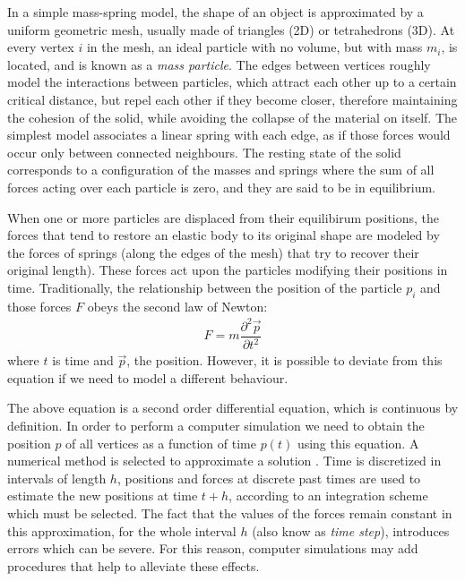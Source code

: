 \documentclass[journal]{IEEEtran}
\begin{document}
In a simple mass-spring model, the shape of an object is approximated by a uniform geometric mesh, usually made of triangles (2D) or tetrahedrons (3D).  At every vertex $i$ in the mesh, an ideal particle with no volume, but with mass $m_i$, is located, and is known as a \textit{mass particle}.  The edges between vertices roughly model the interactions between particles, which attract each other up to a certain critical distance, but repel each other if they become closer, therefore maintaining the cohesion of the solid, while avoiding the collapse of the material on itself.  The simplest model associates a linear spring with each edge, as if those forces would occur only between connected neighbours.  The resting state of the solid corresponds to a configuration of the masses and springs where the sum of all forces acting over each particle is zero, and they are said to be in equilibrium.

When one or more particles are displaced from their equilibirum positions, the forces that tend to restore an elastic body to its original shape are modeled by the forces of springs (along the edges of the mesh) that try to recover their original length).  These forces act upon the particles modifying their positions in time.  Traditionally, the relationship between the position of the particle $p_i$ and those forces $F$ obeys the second law of Newton:
\begin{align}
F = m \dfrac{\partial^2 \vec{p}}{\partial t^2} \label{eq:newton}
\end{align}
where $t$ is time and $\vec{p}$, the position.  However, it is possible to deviate from this equation if we need to model a different behaviour. %

The above equation is a second order differential equation, which is continuous by definition.  In order to perform a computer simulation we need to obtain the position $p$ of all vertices as a function of time $p(t)$ using this equation.  A numerical method is selected to approximate a solution \cite{Nealen2006review}.  Time is discretized in intervals of length $h$, positions and forces at discrete past times are used to estimate the new positions at time $t + h$, according to an integration scheme which must be selected.  The fact that the values of the forces remain constant in this approximation, for the whole interval $h$ (also know as \textit{time step}), introduces errors which can be severe.  For this reason, computer simulations may add procedures that help to alleviate these effects.  
\end{document}
